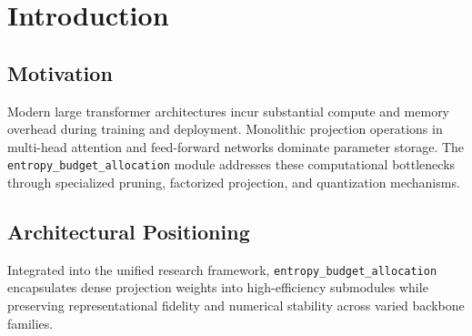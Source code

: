 \section{Introduction}

\subsection{Motivation}
Modern large transformer architectures incur substantial compute and memory overhead during training and deployment. Monolithic projection operations in multi-head attention and feed-forward networks dominate parameter storage. The \texttt{entropy_budget_allocation} module addresses these computational bottlenecks through specialized pruning, factorized projection, and quantization mechanisms.

\subsection{Architectural Positioning}
Integrated into the unified research framework, \texttt{entropy_budget_allocation} encapsulates dense projection weights into high-efficiency submodules while preserving representational fidelity and numerical stability across varied backbone families.
